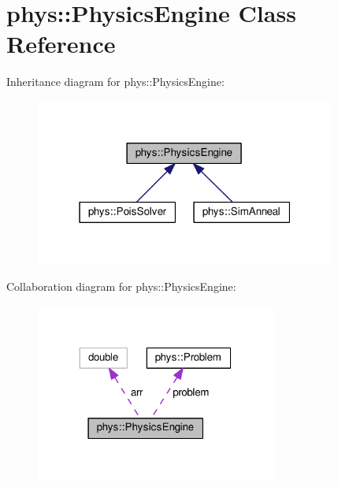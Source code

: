 \hypertarget{classphys_1_1PhysicsEngine}{}\section{phys\+:\+:Physics\+Engine Class Reference}
\label{classphys_1_1PhysicsEngine}


Inheritance diagram for phys\+:\+:Physics\+Engine\+:
\nopagebreak
\begin{figure}[H]
\begin{center}
\leavevmode
\includegraphics[width=280pt]{classphys_1_1PhysicsEngine__inherit__graph}
\end{center}
\end{figure}


Collaboration diagram for phys\+:\+:Physics\+Engine\+:
\nopagebreak
\begin{figure}[H]
\begin{center}
\leavevmode
\includegraphics[width=224pt]{classphys_1_1PhysicsEngine__coll__graph}
\end{center}
\end{figure}

